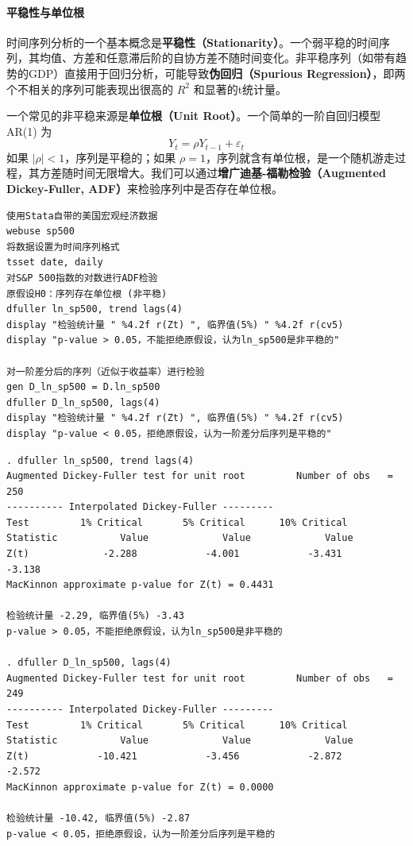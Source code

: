 \paragraph*{平稳性与单位根}
时间序列分析的一个基本概念是\textbf{平稳性（Stationarity）}。一个弱平稳的时间序列，其均值、方差和任意滞后阶的自协方差不随时间变化。非平稳序列（如带有趋势的GDP）直接用于回归分析，可能导致\textbf{伪回归（Spurious Regression）}，即两个不相关的序列可能表现出很高的 $R^2$ 和显著的t统计量。

一个常见的非平稳来源是\textbf{单位根（Unit Root）}。一个简单的一阶自回归模型 AR(1) 为
\[
Y_t = \rho Y_{t-1} + \varepsilon_t
\]
如果 $|\rho|<1$，序列是平稳的；如果 $\rho=1$，序列就含有单位根，是一个随机游走过程，其方差随时间无限增大。我们可以通过\textbf{增广迪基-福勒检验（Augmented Dickey-Fuller, ADF）}来检验序列中是否存在单位根。

\begin{tcolorbox}[title=在 Stata 中进行单位根检验, colback=white, colframe=black, colbacktitle=white, coltitle=black,fonttitle=\bfseries]
\begin{lstlisting}[xleftmargin=2em, commentstyle=\color{black}]
使用Stata自带的美国宏观经济数据
webuse sp500
将数据设置为时间序列格式
tsset date, daily
对S&P 500指数的对数进行ADF检验
原假设H0：序列存在单位根 (非平稳)
dfuller ln_sp500, trend lags(4)
display "检验统计量 " %4.2f r(Zt) ", 临界值(5%) " %4.2f r(cv5)
display "p-value > 0.05，不能拒绝原假设，认为ln_sp500是非平稳的"

对一阶差分后的序列（近似于收益率）进行检验
gen D_ln_sp500 = D.ln_sp500
dfuller D_ln_sp500, lags(4)
display "检验统计量 " %4.2f r(Zt) ", 临界值(5%) " %4.2f r(cv5)
display "p-value < 0.05，拒绝原假设，认为一阶差分后序列是平稳的"
\end{lstlisting}
\vspace{-2em}
\begin{Verbatim}[commandchars=\\\{\},xleftmargin=2em]
. dfuller ln_sp500, trend lags(4)
Augmented Dickey-Fuller test for unit root         Number of obs   =      250
---------- Interpolated Dickey-Fuller ---------
Test         1% Critical       5% Critical      10% Critical
Statistic           Value             Value             Value
Z(t)             -2.288            -4.001            -3.431            -3.138
MacKinnon approximate p-value for Z(t) = 0.4431

检验统计量 -2.29, 临界值(5%) -3.43
p-value > 0.05，不能拒绝原假设，认为ln_sp500是非平稳的

. dfuller D_ln_sp500, lags(4)
Augmented Dickey-Fuller test for unit root         Number of obs   =      249
---------- Interpolated Dickey-Fuller ---------
Test         1% Critical       5% Critical      10% Critical
Statistic           Value             Value             Value
Z(t)            -10.421            -3.456            -2.872            -2.572
MacKinnon approximate p-value for Z(t) = 0.0000

检验统计量 -10.42, 临界值(5%) -2.87
p-value < 0.05，拒绝原假设，认为一阶差分后序列是平稳的
\end{Verbatim}
\end{tcolorbox}


